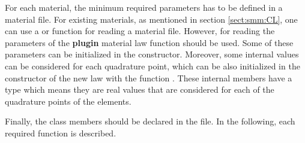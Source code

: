 For each material, the minimum required parameters has to be defined in
a material file.  For existing materials, as mentioned in section
\ref{sect:smm:CL}, one can use a 
or  function for reading a material file. However, for reading the parameters of
the  \textbf{plugin} material  law   function
should be used. Some of  these parameters can  be initialized  in the
constructor. Moreover, some internal values can be considered
for  each  quadrature  point,  which   can  be  also  initialized  in  the
constructor of the new law with the
function . These internal
members have a  type which means they are
real values that are considered for each of the quadrature points of the elements.



Finally,    the    class   members    should    be    declared   in    the
 file. In the following, each required function is described.


